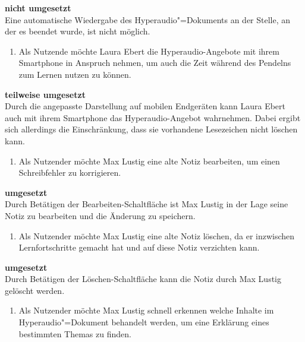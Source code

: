 \vspace{-0.1cm}
\textbf{nicht umgesetzt}\\
Eine automatische Wiedergabe des Hyperaudio"=Dokuments an der Stelle, an der es beendet wurde, ist nicht möglich.
\vspace{0.25cm}
\begin{enumerate}[resume*]
\item \label{US-Mobil-Eval} Als Nutzende möchte Laura Ebert die Hyperaudio-Angebote mit ihrem Smartphone in Anspruch nehmen, um auch die Zeit während des Pendelns zum Lernen nutzen zu können.
\end{enumerate}
\vspace{-0.1cm}
\textbf{teilweise umgesetzt}\\
Durch die angepasste Darstellung auf mobilen Endgeräten kann Laura Ebert auch mit ihrem Smartphone das Hyperaudio-Angebot wahrnehmen. Dabei ergibt sich allerdings die Einschränkung, dass sie vorhandene Lesezeichen nicht löschen kann.
\vspace{0.25cm}
\begin{enumerate}[resume*]
\item \label{US-Notiz-Bearbeiten-Eval} Als Nutzender möchte Max Lustig eine alte Notiz bearbeiten, um einen Schreibfehler zu korrigieren.
\end{enumerate}
\vspace{-0.1cm}
\textbf{umgesetzt}\\
Durch Betätigen der \glqq Bearbeiten\grqq{}-Schaltfläche ist Max Lustig in der Lage seine Notiz zu bearbeiten und die Änderung zu speichern.
\vspace{0.25cm}
\begin{enumerate}[resume*]
\item \label{US-Notiz-Loeschen-Eval} Als Nutzender möchte Max Lustig eine alte Notiz löschen, da er inzwischen Lernfortschritte gemacht hat und auf diese Notiz verzichten kann.
\end{enumerate}
\vspace{-0.1cm}
\textbf{umgesetzt}\\
Durch Betätigen der \glqq Löschen\grqq{}-Schaltfläche kann die Notiz durch Max Lustig gelöscht werden.
\vspace{0.25cm}
\begin{enumerate}[resume*]
\item \label{US-Galerie-Eval} Als Nutzender möchte Max Lustig schnell erkennen welche Inhalte im Hyperaudio"=Dokument behandelt werden, um eine Erklärung eines bestimmten Themas zu finden.
\end{enumerate}
